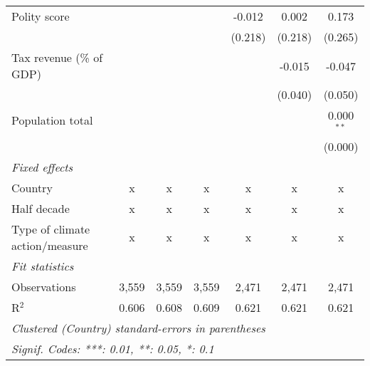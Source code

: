 \begin{tabular}{lcccccc}
   Polity score                                                  &             &                &                & -0.012         & 0.002          & 0.173\\   
                                                                 &             &                &                & (0.218)        & (0.218)        & (0.265)\\   
   Tax revenue (\% of GDP)                                       &             &                &                &                & -0.015         & -0.047\\   
                                                                 &             &                &                &                & (0.040)        & (0.050)\\   
   Population total                                              &             &                &                &                &                & 0.000$^{**}$\\   
                                                                 &             &                &                &                &                & (0.000)\\   
   \emph{Fixed effects}\\
   Country                                                       & x           & x              & x              & x              & x              & x\\  
   Half decade                                                   & x           & x              & x              & x              & x              & x\\  
   Type of climate action/measure                                & x           & x              & x              & x              & x              & x\\  
   \midrule \emph{Fit statistics}\\
   Observations                                                  & 3,559       & 3,559          & 3,559          & 2,471          & 2,471          & 2,471\\  
   R$^2$                                                         & 0.606       & 0.608          & 0.609          & 0.621          & 0.621          & 0.621\\  
   \midrule
   \multicolumn{7}{l}{\emph{Clustered (Country) standard-errors in parentheses}}\\
   \multicolumn{7}{l}{\emph{Signif. Codes: ***: 0.01, **: 0.05, *: 0.1}}\\
\end{tabular}
\par\endgroup


